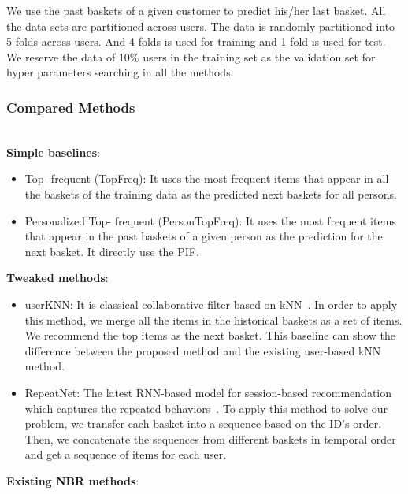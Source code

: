 \documentclass[sigconf]{acmart}
\begin{document}
We use the  past baskets of a given customer to  predict his/her last basket. All the data sets are partitioned across users.  The data is randomly  partitioned into 5 folds across users. And 4 folds is used for training and 1 fold is used for test. We reserve the data of 10\% users in the training set as the validation set for hyper parameters searching in all the methods.  



\subsubsection{Compared  Methods}
\label{sec:baseline}
\ \\
\textbf{Simple baselines}:
\begin{itemize}

\item{Top- frequent (TopFreq):} It uses the most frequent  items  that appear in all the baskets of  the training data as the predicted  next baskets for  all persons.
\item{Personalized Top- frequent (PersonTopFreq):} It uses the most frequent  items that appear in the past baskets  of a given person as the prediction for the next basket. It directly use the PIF.
\end{itemize}
\textbf{Tweaked methods}:
\begin{itemize}
\item{userKNN:} It is classical collaborative filter  based on  kNN~\cite{konstan1997grouplens}. In order to apply this method, we merge  all the  items in the  historical baskets as a set of items. We recommend the top  items as the next basket. This baseline can show the difference  between the  proposed method and the existing user-based kNN method.
\item{RepeatNet:} The latest  RNN-based model  for session-based recommendation which captures the repeated behaviors~\cite{ren2019repeatnet}. To apply this method to solve our problem, we transfer each basket into a sequence based on the ID's order. Then, we concatenate the sequences from  different baskets in temporal order and get a  sequence of items for each user.
\end{itemize}
\textbf{Existing NBR methods}:
\end{document}
